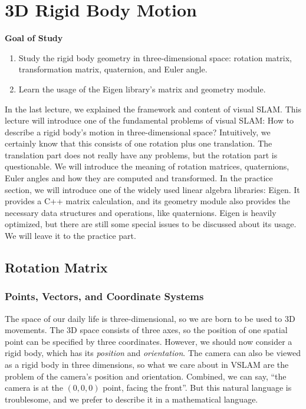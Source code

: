 \chapter{3D Rigid Body Motion}
\label{cpt:3}

\begin{mdframed}
	\textbf{Goal of Study}
	\begin{enumerate}
		\item Study the rigid body geometry in three-dimensional space: rotation matrix, transformation matrix, quaternion, and Euler angle.
		\item Learn the usage of the Eigen library's matrix and geometry module.
	\end{enumerate}
\end{mdframed}

In the last lecture, we explained the framework and content of visual SLAM. This lecture will introduce one of the fundamental problems of visual SLAM: How to describe a rigid body's motion in three-dimensional space? Intuitively, we certainly know that this consists of one rotation plus one translation. The translation part does not really have any problems, but the rotation part is questionable. We will introduce the meaning of rotation matrices, quaternions, Euler angles and how they are computed and transformed. In the practice section, we will introduce one of the widely used linear algebra libraries: Eigen. It provides a C++ matrix calculation, and its geometry module also provides the necessary data structures and operations, like quaternions. Eigen is heavily optimized, but there are still some special issues to be discussed about its usage. We will leave it to the practice part.

\newpage

\newpage

\section{Rotation Matrix}
\label{sec:3.1}
\subsection{Points, Vectors, and Coordinate Systems}
The space of our daily life is three-dimensional, so we are born to be used to 3D movements. The 3D space consists of three axes, so the position of one spatial point can be specified by three coordinates. However, we should now consider a rigid body, which has its \textit{position} and \textit{orientation}. The camera can also be viewed as a rigid body in three dimensions, so what we care about in VSLAM are the problem of the camera's position and orientation.  Combined, we can say, ``the camera is at the $( 0, 0, 0)$ point, facing the front''. But this natural language is troublesome, and we prefer to describe it in a mathematical language.

